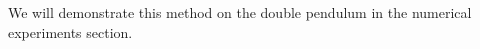 \documentclass[final,3p,times]{elsarticle}
\newtheorem{example}[theorem]{Example}
\begin{document}
We will demonstrate this method on the double pendulum in the numerical experiments section. 

\end{document}

